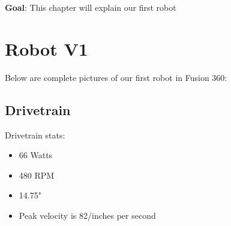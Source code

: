 \textbf{Goal}: This chapter will explain our first robot
\section*{Robot V1}
Below are complete pictures of our first robot in Fusion 360:
\subsection*{Drivetrain}
Drivetrain stats:
\begin{itemize}
    \item 66 Watts
    \item 480 RPM
    \item 14.75"
    \item Peak velocity is 82/inches per second
\end{itemize}
